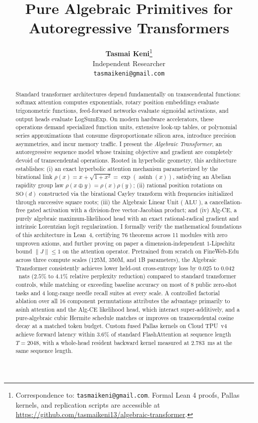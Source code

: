 \documentclass[11pt,a4paper]{article}
\title{\textbf{Pure Algebraic Primitives for Autoregressive Transformers}}
\author{
  \textbf{Tasmai Keni}\thanks{Correspondence to: \texttt{tasmaikeni@gmail.com}. Formal Lean 4 proofs, Pallas kernels, and replication scripts are accessible at \url{https://github.com/tasmaikeni13/algebraic-transformer}.} \\
  Independent Researcher \\
  \texttt{tasmaikeni@gmail.com}
}
\date{}
\theoremstyle{definition}
\newcommand{\SO}{\mathrm{SO}}
\begin{document}
\maketitle

\begin{abstract}
Standard transformer architectures depend fundamentally on transcendental functions: softmax attention computes exponentials, rotary position embeddings evaluate trigonometric functions, feed-forward networks evaluate sigmoidal activations, and output heads evaluate LogSumExp. On modern hardware accelerators, these operations demand specialized function units, extensive look-up tables, or polynomial series approximations that consume disproportionate silicon area, introduce precision asymmetries, and incur memory traffic. I present the \emph{Algebraic Transformer}, an autoregressive sequence model whose training objective and gradient are completely devoid of transcendental operations. Rooted in hyperbolic geometry, this architecture establishes: (i) an exact hyperbolic attention mechanism parameterized by the birational link $\rho(x) = x + \sqrt{1+x^2} = \exp(\operatorname{asinh}(x))$, satisfying an Abelian rapidity group law $\rho(x \oplus y) = \rho(x)\rho(y)$; (ii) rational position rotations on $\SO(d)$ constructed via the birational Cayley transform with frequencies initialized through successive square roots; (iii) the Algebraic Linear Unit ($\operatorname{ALU}$), a cancellation-free gated activation with a division-free vector-Jacobian product; and (iv) Alg-CE, a purely algebraic maximum-likelihood head with an exact rational-radical gradient and intrinsic Lorentzian logit regularization. I formally verify the mathematical foundations of this architecture in Lean~4, certifying 76 theorems across 11 modules with zero unproven axioms, and further proving on paper a dimension-independent $1$-Lipschitz bound $\|J\| \le 1$ on the attention operator. Pretrained from scratch on FineWeb-Edu across three compute scales (125M, 350M, and 1B parameters), the Algebraic Transformer consistently achieves lower held-out cross-entropy loss by $0.025$ to $0.042$~nats ($2.5\%$ to $4.1\%$ relative perplexity reduction) compared to standard transformer controls, while matching or exceeding baseline accuracy on most of 8 public zero-shot tasks and 4 long-range needle recall suites at every scale. A controlled factorial ablation over all 16 component permutations attributes the advantage primarily to asinh attention and the Alg-CE likelihood head, which interact super-additively, and a pure-algebraic cubic Hermite schedule matches or improves on transcendental cosine decay at a matched token budget. Custom fused Pallas kernels on Cloud TPU~v4 achieve forward latency within $3.6\%$ of standard FlashAttention at sequence length $T=2048$, with a whole-head resident backward kernel measured at $2.783$~ms at the same sequence length.
\end{abstract}
\end{document}
